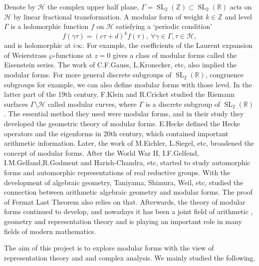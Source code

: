 \documentclass[11pt,english]{smfart}
\theoremstyle{definition}
\theoremstyle{remark}
\newcommand{\R}{\mathbb{R}}
\newcommand{\Z}{\mathbb{Z}}
\DeclareMathOperator{\SL}{SL}
\newcommand{\under}{\!\setminus\!}
\begin{document}
Denote by $\mathcal{H}$ the complex upper half plane, $\Gamma = \SL_2(\Z)\subset\SL_2(\R)$ acts on $\mathcal{H}$ by linear fractional transformation. A modular form of weight $k\in\Z$ and level $\Gamma$ is a holomorphic function $f$ on $\mathcal{H}$ satisfying a `periodic condition' \[ f(\gamma \tau) = (c\tau+d)^kf(\tau),\ \forall \gamma\in\Gamma,\tau\in\mathcal{H},
\]and is holomorphic at $i\infty$.
For example, the coefficients of the Laurent expansion of Weierstrass $\wp$-functions at $z=0$ gives a class of modular forms called the Eisenstein series. The work of C.F.Gauss, L.Kronecker, etc, also implied the modular forms. For more general discrete subgroups of $\SL_2(\R)$, congruence subgroups for example, we can also define modular forms with those level.
In the latter part of the 19th century, F.Klein and R.Cricket studied the Riemann surfaces $\Gamma\under\mathcal{H}$ called modular curves, where $\Gamma$ is a discrete subgroup of $\SL_2(\R)$. The essential method they used were modular forms, and in their study they developed the geometric theory of modular forms. E.Hecke defined the Hecke operators and the eigenforms in 20th century, which contained important arithmetic information. Later, the work of  M.Eichler, L.Siegel, etc, broadened the concept of modular forms.
After the World War II, I.F.Gelfend,  I.M.Gelfand,R.Godment and Harish-Chandra, etc, started to study automorphic forms and automorphic representations of real reductive groups. With the development of algebraic geometry, Taniyama, Shimura, Weil, etc, studied the connection between arithmetic algebraic geometry and modular forms. The proof of Fermat Last Theorem also relies on that. Afterwards, the theory of modular forms continued to develop, and nowadays it has been a joint field of arithmetic , geometry and representation theory and is playing an important role in many fields of modern mathematics.

The aim of this project is to explore modular forms with the view of representation theory and and complex analysis. We mainly studied the following.
\end{document}
